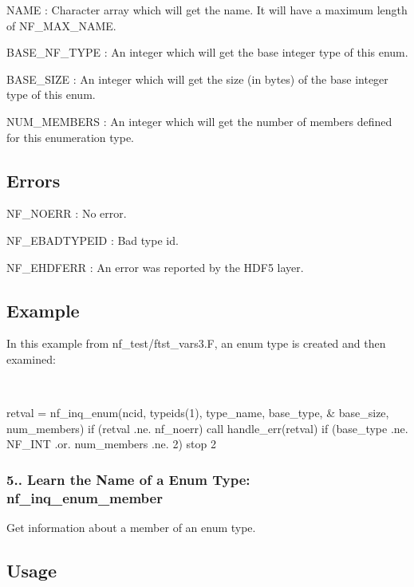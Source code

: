 {\ttfamily N\+A\+ME} \+: Character array which will get the name. It will have a maximum length of N\+F\+\_\+\+M\+A\+X\+\_\+\+N\+A\+ME.

{\ttfamily B\+A\+S\+E\+\_\+\+N\+F\+\_\+\+T\+Y\+PE} \+: An integer which will get the base integer type of this enum.

{\ttfamily B\+A\+S\+E\+\_\+\+S\+I\+ZE} \+: An integer which will get the size (in bytes) of the base integer type of this enum.

{\ttfamily N\+U\+M\+\_\+\+M\+E\+M\+B\+E\+RS} \+: An integer which will get the number of members defined for this enumeration type.

\subsection*{Errors }

{\ttfamily N\+F\+\_\+\+N\+O\+E\+RR} \+: No error.

{\ttfamily N\+F\+\_\+\+E\+B\+A\+D\+T\+Y\+P\+E\+ID} \+: Bad type id.

{\ttfamily N\+F\+\_\+\+E\+H\+D\+F\+E\+RR} \+: An error was reported by the H\+D\+F5 layer.

\subsection*{Example }

In this example from nf\+\_\+test/ftst\+\_\+vars3.\+F, an enum type is created and then examined\+:

 

\begin{DoxyVerb}  retval = nf_inq_enum(ncid, typeids(1), type_name, base_type,
 &     base_size, num_members)
  if (retval .ne. nf_noerr) call handle_err(retval)
  if (base_type .ne. NF_INT .or. num_members .ne. 2) stop 2
\end{DoxyVerb}


\subsubsection*{5.. Learn the Name of a Enum Type\+: nf\+\_\+inq\+\_\+enum\+\_\+member}

Get information about a member of an enum type.

\subsection*{Usage }


